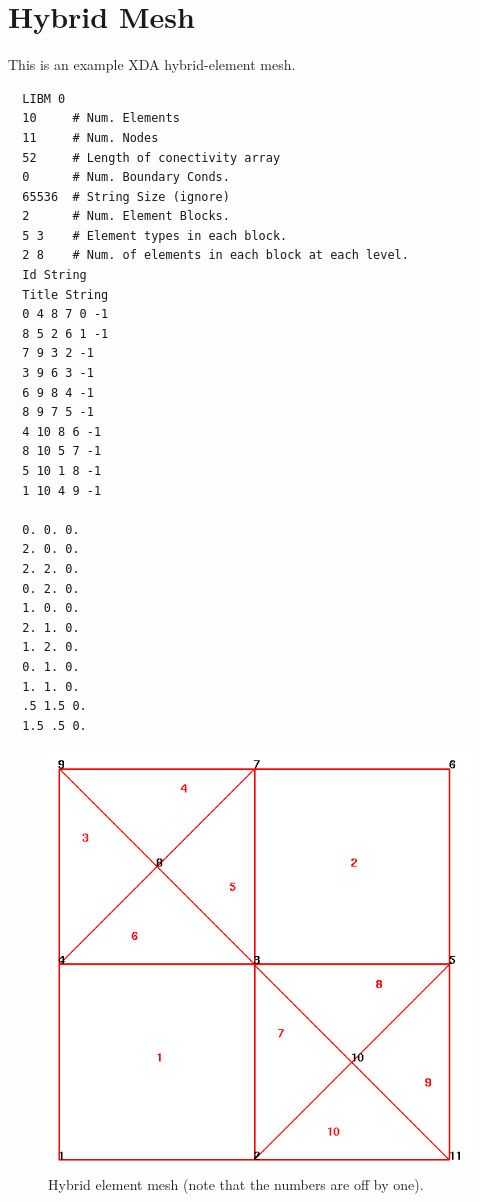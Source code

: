 \documentclass[12pt]{article}
\begin{document}
\clearpage
\appendix
\section{Hybrid Mesh}
This is an example XDA hybrid-element mesh.
\small
\begin{verbatim}
  LIBM 0
  10     # Num. Elements
  11     # Num. Nodes
  52     # Length of conectivity array
  0      # Num. Boundary Conds.
  65536  # String Size (ignore)
  2      # Num. Element Blocks.
  5 3    # Element types in each block.
  2 8    # Num. of elements in each block at each level.
  Id String
  Title String
  0 4 8 7 0 -1 
  8 5 2 6 1 -1 
  7 9 3 2 -1 
  3 9 6 3 -1 
  6 9 8 4 -1 
  8 9 7 5 -1 
  4 10 8 6 -1 
  8 10 5 7 -1 
  5 10 1 8 -1 
  1 10 4 9 -1 

  0. 0. 0.
  2. 0. 0.
  2. 2. 0.
  0. 2. 0.
  1. 0. 0.
  2. 1. 0.
  1. 2. 0.
  0. 1. 0.
  1. 1. 0.
  .5 1.5 0.
  1.5 .5 0.
\end{verbatim}
\normalsize

\clearpage
\begin{figure}
  \centerline{\includegraphics[width=.9\textwidth]{hybrid_mesh}}
  \caption{Hybrid element mesh (note that the numbers are off by one).}
\end{figure}

\clearpage
\end{document}
